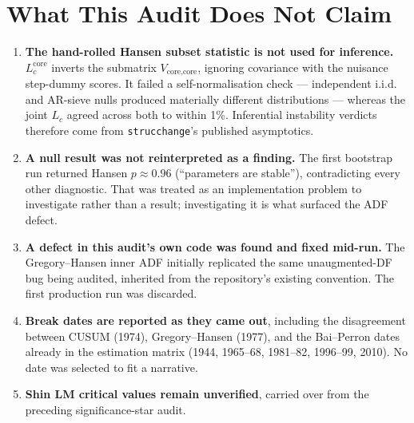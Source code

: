 \documentclass[11pt,a4paper]{article}
\begin{document}
\section{What This Audit Does Not Claim}
\begin{enumerate}
\item \textbf{The hand-rolled Hansen subset statistic is not used for inference.} $L_c^{\text{core}}$ inverts the submatrix $V_{\text{core,core}}$, ignoring covariance with the nuisance step-dummy scores. It failed a self-normalisation check --- independent i.i.d. and AR-sieve nulls produced materially different distributions --- whereas the joint $L_c$ agreed across both to within 1\%. Inferential instability verdicts therefore come from \texttt{strucchange}'s published asymptotics.
\item \textbf{A null result was not reinterpreted as a finding.} The first bootstrap run returned Hansen $p \approx 0.96$ (``parameters are stable''), contradicting every other diagnostic. That was treated as an implementation problem to investigate rather than a result; investigating it is what surfaced the ADF defect.
\item \textbf{A defect in this audit's own code was found and fixed mid-run.} The Gregory--Hansen inner ADF initially replicated the same unaugmented-DF bug being audited, inherited from the repository's existing convention. The first production run was discarded.
\item \textbf{Break dates are reported as they came out}, including the disagreement between CUSUM (1974), Gregory--Hansen (1977), and the Bai--Perron dates already in the estimation matrix (1944, 1965--68, 1981--82, 1996--99, 2010). No date was selected to fit a narrative.
\item \textbf{Shin LM critical values remain unverified}, carried over from the preceding significance-star audit.
\end{enumerate}
\FloatBarrier
\end{document}
